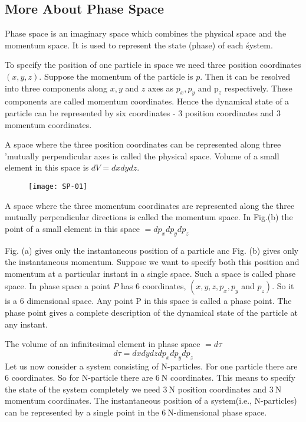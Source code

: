 \subsection{More About Phase Space}
Phase space is an imaginary space which combines the physical space and the momentum space. It is used to represent the state (phase) of each śystem.\\
\par To specify the position of one particle in space we need three position coordinates $(x, y, z)$. Suppose the momentum of the particle is $p$. Then it can be resolved into three components along $x, y$ and $z$ axes as $p_{x}, p_{y}$ and $\mathrm{p}_{z}$ respectively. These components are called momentum coordinates. Hence the dynamical state of a particle can be represented by six coordinates - 3 position coordinates and 3 momentum coordinates.\\
\par A space where the three position coordinates can be represented along three 'mutually perpendicular axes is called the physical space. Volume of a small element in this space is $d V=d x d y d z$.
\begin{figure}[H]
	\centering
	\texttt{[image: SP-01]}
\end{figure}
\par A space where the three momentum coordinates are represented along the three mutually perpendicular directions is called the momentum space. In Fig.(b) the point of a small element in this space $=d p_{x} d p_{y} d p_{z}$\\
\par Fig. (a) gives only the instantaneous position of a particle anc Fig. (b) gives only the instantaneous momentum. Suppose we want to specify both this position and momentum at a particular instant in a single space. Such a space is called phase space. In phase space a point $P$ has 6 coordinates, $\left(x, y, z, p_{x}, p_{y}\right.$ and $\left.p_{z}\right)$. So it is a 6 dimensional space. Any point $\mathrm{P}$ in this space is called a phase point. The phase point gives a complete description of the dynamical state of the particle at any instant.\\
\par The volume of an infinitesimal element in phase space $=d \tau$
$$
d \tau=d x d y d z d p_{x} d p_{y} d p_{z}
$$
Let us now consider a system consisting of N-particles. For one particle there are 6 coordinates. So for N-particle there are $6 \mathrm{~N}$ coordinates. This means to specify the state of the system completely we need $3 \mathrm{~N}$ position coordinates and $3 \mathrm{~N}$ momentum coordinates. The instantaneous position of a system(i.e., N-particles) can be represented by a single point in the $6 \mathrm{~N}$-dimensional phase space.
